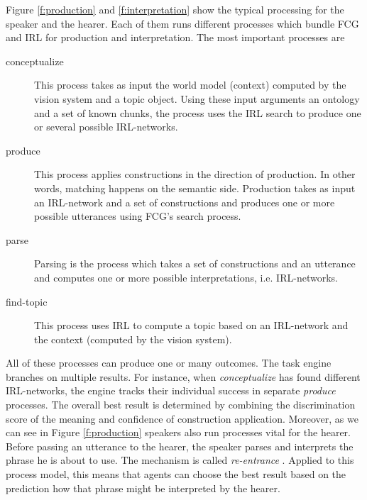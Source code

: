 Figure \ref{f:production} and \ref{f:interpretation} show the typical processing 
for the speaker and the hearer.
Each of them runs different processes which bundle FCG 
and IRL for production and interpretation. The most 
important processes are 
\begin{description}
\item[conceptualize] This process takes as input the world model (context) computed 
by the vision system and a topic object. Using these input 
arguments an ontology and a set of known chunks, the process uses the 
IRL search to produce one or several possible IRL-networks.
\item[produce] This process applies constructions in the direction of production.
In other words, matching happens on the semantic side. Production takes as input
an IRL-network and a set of constructions and produces one or more possible utterances
using FCG's search process.
\item[parse] Parsing is the process which takes a set of constructions and an utterance
and computes one or more possible interpretations, i.e. IRL-networks.
\item[find-topic] This process uses IRL to compute a topic based on 
an IRL-network and the context (computed by the vision system).
\end{description}
All of these processes can produce one or many outcomes. The task engine
branches on multiple results. For instance, when \emph{conceptualize} has found
different IRL-networks, the engine tracks their individual success in separate 
\emph{produce} processes. The overall best result is determined by 
combining the discrimination score of the meaning and confidence of construction 
application. Moreover, as we can see in Figure \ref{f:production} speakers also run processes vital 
for the hearer. Before passing an utterance to the hearer, the speaker parses and
interprets the phrase he is about to use. The mechanism is called 
\emph{re-entrance} \citep{steels03reentrance}. Applied to this process model,
this means that agents can choose the best result based on the 
prediction how that phrase might be interpreted by the hearer.

